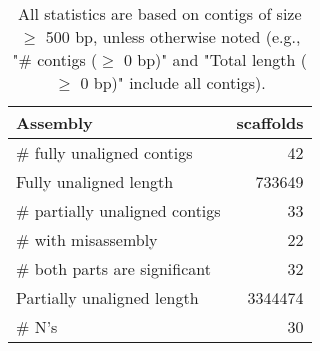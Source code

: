 \documentclass[12pt,a4paper]{article}
\begin{document}
\begin{table}[ht]
\begin{center}
\caption{All statistics are based on contigs of size $\geq$ 500 bp, unless otherwise noted (e.g., "\# contigs ($\geq$ 0 bp)" and "Total length ($\geq$ 0 bp)" include all contigs).}
\begin{tabular}{|l*{1}{|r}|}
\hline
Assembly & scaffolds \\ \hline
\# fully unaligned contigs & 42 \\ \hline
Fully unaligned length & 733649 \\ \hline
\# partially unaligned contigs & 33 \\ \hline
\hspace{5mm}\# with misassembly & 22 \\ \hline
\hspace{5mm}\# both parts are significant & 32 \\ \hline
Partially unaligned length & 3344474 \\ \hline
\# N's & 30 \\ \hline
\end{tabular}
\end{center}
\end{table}
\end{document}
